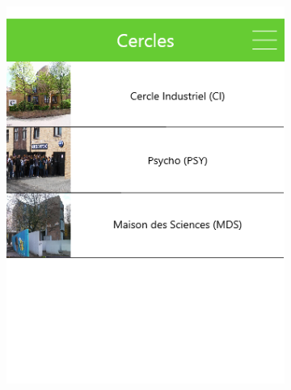 \documentclass{eplmastersthesis}
\begin{document}
\begin{figure}[H]
\begin{subfigure}[b]{0.3\textwidth}
        \includegraphics[width=\textwidth]{Images/InVision/cercleliste.png}
    \end{subfigure}
    ~ %
    \begin{subfigure}[b]{0.3\textwidth}

\end{subfigure}
\end{figure}
\end{document}
